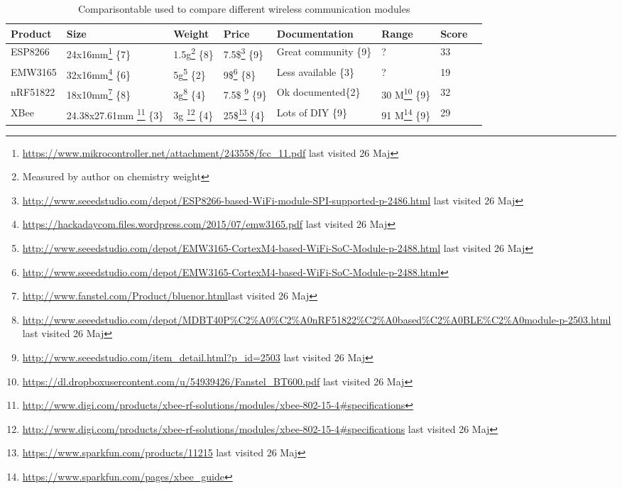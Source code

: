 \begin{savenotes}
\begin{table}[H]
	\centering
	\begin{tabular}{@{}|l|l|l|l|l|l|l|l|@{}}
		\toprule
		\textbf{Product} & \textbf{Size} & \textbf{Weight} & \textbf{Price} & \textbf{Documentation} &  \textbf{Range}  & \textbf{Score} \\ \midrule
		ESP8266   &  24x16mm\footnote{\url{https://www.mikrocontroller.net/attachment/243558/fcc\_11.pdf} last visited 26 Maj} \hfill\{7\} & 1.5g\footnote{Measured by author on chemistry weight} \hfill\{8\} &   7.5\$\footnote{\url{http://www.seeedstudio.com/depot/ESP8266-based-WiFi-module-SPI-supported-p-2486.html} last visited 26 Maj}  \hfill\{9\}  &   Great community \hfill\{9\}  &    ?    &          33      		\\ \midrule
		EMW3165   &  32x16mm\footnote{\url{https://hackadaycom.files.wordpress.com/2015/07/emw3165.pdf} last visited 26 Maj} \hfill\{6\}  & 5g\footnote{\url{http://www.seeedstudio.com/depot/EMW3165-CortexM4-based-WiFi-SoC-Module-p-2488.html} last visited 26 Maj} \hfill\{2\} &  9\$\footnote{\url{http://www.seeedstudio.com/depot/EMW3165-CortexM4-based-WiFi-SoC-Module-p-2488.html}} \hfill\{8\}   &  Less available  \hfill\{3\}	        &    ?    &    19            		\\ \midrule
		nRF51822  &  18x10mm\footnote{\url{http://www.fanstel.com/Product/bluenor.html}last visited 26 Maj} \hfill\{8\}  & 3g\footnote{\url{http://www.seeedstudio.com/depot/MDBT40P\%C2\%A0\%C2\%A0nRF51822\%C2\%A0based\%C2\%A0BLE\%C2\%A0module-p-2503.html} last visited 26 Maj} \hfill\{4\}  &  7.5\$ \footnote{\url{http://www.seeedstudio.com/item_detail.html?p_id=2503} last visited 26 Maj} \hfill\{9\}   & Ok documented\hfill\{2\} 	        &   30 M\footnote{\url{https://dl.dropboxusercontent.com/u/54939426/Fanstel_BT600.pdf} last visited 26 Maj}  \hfill\{9\}     &               32 		\\ \midrule
		XBee      &  24.38x27.61mm \footnote{\url{http://www.digi.com/products/xbee-rf-solutions/modules/xbee-802-15-4\#specifications}} \{3\} & 3g \footnote{\url{http://www.digi.com/products/xbee-rf-solutions/modules/xbee-802-15-4\#specifications} last visited 26 Maj} \hfill\{4\} &   25\$\footnote{\url{https://www.sparkfun.com/products/11215} last visited 26 Maj}  \hfill\{4\}  &  Lots of DIY   \hfill\{9\}      &            91 M\footnote{\url{https://www.sparkfun.com/pages/xbee_guide}}  \hfill\{9\}  &             29       \\ \bottomrule
	\end{tabular}
	\caption{Comparisontable used to compare different wireless 		communication modules}
	\label{tab:compare_table_wireless_communication}
\end{table}
    \end{savenotes}

